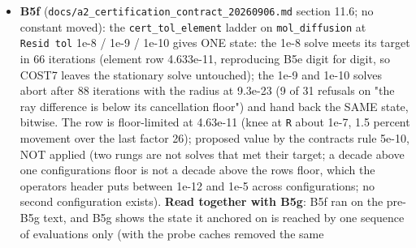 \documentclass[english,a4paper]{my_memo}
\begin{document}
\begin{itemize}
  Part 2, the carrier rows: all 18 "no Krylov direction" exits and all 514
  refused samples were ONE thing, the H2 carrier of cell 500 at -7.4e-19
  (a species unknown on its lower bound), not the element budget (the
  counter\textquotesingle s label named one screen of several; corrected, census added);
  \texttt{jv\_product} now takes the backward difference \texttt{{[}F(Y)\ -\ F(Y\ -\ eps\ v){]}/eps}
  only after every forward halving is refused: 49/0/0 accepted/rejected/
  refused where 31/18/18, GMRES truncations 18 -\textgreater{} 0, radius 8e-3 -\textgreater{} 2.05;
  \texttt{\textbar{}\textbar{}R\textbar{}\textbar{}} unchanged at 1.873 because the dogleg cuts steps by 2\^{}-25..2\^{}-49
  against the same bound from the trial side, a bound-constrained unknown
  space (decision, not repair). \texttt{cert\_tol\_carrier} UNCONFIRMED. Suites
  (advisor build): \texttt{steady\_species\_rows} 74/0 (88/0 with the self-test pair
  logs), \texttt{certification} 29/0, \texttt{coupled\_source\_step} 44/0, \texttt{carrier\_retry}
  100/0, \texttt{species\_face\_flux} green; advisor re-ran \texttt{wasp\_full\_newton} in full
  with the B5g binary: \texttt{Hydro\_ioniz.txt} and \texttt{Ion\_species.txt} IDENTICAL to
  the gate-3 output, CERTIFIED, log10 Mdot 13.30.
\item
  \textbf{B5f} (\texttt{docs/a2\_certification\_contract\_20260906.md} section 11.6; no
  constant moved): the \texttt{cert\_tol\_element} ladder on \texttt{mol\_diffusion} at
  \texttt{Resid\ tol} 1e-8 / 1e-9 / 1e-10 gives ONE state: the 1e-8 solve meets its
  target in 66 iterations (element row 4.633e-11, reproducing B5e digit for
  digit, so COST7 leaves the stationary solve untouched); the 1e-9 and
  1e-10 solves abort after 88 iterations with the radius at 9.3e-23 (9 of
  31 refusals on "the ray difference is below its cancellation floor") and
  hand back the SAME state, bitwise. The row is floor-limited at 4.63e-11
  (knee at \texttt{\textbar{}\textbar{}R\textbar{}\textbar{}} about 1e-7, 1.5 percent movement over the last factor
  26); proposed value by the contract\textquotesingle s rule 5e-10, NOT applied (two rungs
  are not solves that met their target; a decade above one configuration\textquotesingle s
  floor is not a decade above the row\textquotesingle s floor, which the operator\textquotesingle s header
  puts between 1e-12 and 1e-5 across configurations; no second
  configuration exists). \textbf{Read together with B5g}: B5f ran on the
  pre-B5g text, and B5g shows the state it anchored on is reached by one
  sequence of evaluations only (with the probe caches removed the same

\end{itemize}
\end{document}

